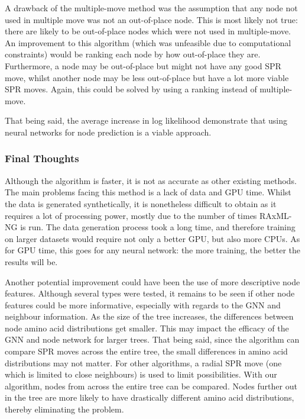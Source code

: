 \documentclass{mpaper}
\begin{document}
A drawback of the multiple-move method was the assumption that any node not used in multiple move was not an out-of-place node. This is most likely not true: there are likely to be out-of-place nodes which were not used in multiple-move. An improvement to this algorithm (which was unfeasible due to computational constraints) would be ranking each node by how out-of-place they are. Furthermore, a node may be out-of-place but might not have any good SPR move, whilst another node may be less out-of-place but have a lot more viable SPR moves. Again, this could be solved by using a ranking instead of multiple-move.

That being said, the average increase in log likelihood demonstrate that using neural networks for node prediction is a viable approach. 


\subsubsection{Final Thoughts}

Although the algorithm is faster, it is not as accurate as other existing methods. The main problems facing this method is a lack of data and GPU time. Whilst the data is generated synthetically, it is nonetheless difficult to obtain as it requires a lot of processing power, mostly due to the number of times RAxML-NG is run. The data generation process took a long time, and therefore training on larger datasets would require not only a better GPU, but also more CPUs. As for GPU time, this goes for any neural network: the more training, the better the results will be.

Another potential improvement could have been the use of more descriptive node features. Although several types were tested, it remains to be seen if other node features could be more informative, especially with regards to the GNN and neighbour information. As the size of the tree increases, the differences between node amino acid distributions get smaller. This may impact the efficacy of the GNN and node network for larger trees. That being said, since the algorithm can compare SPR moves across the entire tree, the small differences in amino acid distributions may not matter. For other algorithms, a radial SPR move (one which is limited to close neighbours) is used to limit possibilities. With our algorithm, nodes from across the entire tree can be compared. Nodes further out in the tree are more likely to have drastically different amino acid distributions, thereby eliminating the problem.
\end{document}
